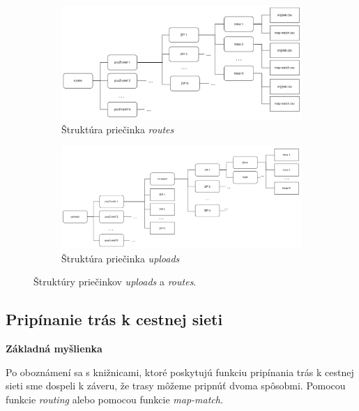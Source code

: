 \begin{figure}[H]
    \centering
    \begin{subfigure}{\textwidth}
        \centering
        \includegraphics[width=1\textwidth]{img/struktura priecinkov/routes.png}
        \caption{Štruktúra priečinka \textit{routes}}
        \label{fig:routes-structure}
    \end{subfigure}
    \begin{subfigure}{\textwidth}
        \centering
        \includegraphics[width=1\textwidth]{img/struktura priecinkov/uploads.png}
        \caption{Štruktúra priečinka \textit{uploads}}
        \label{fig:uploads-structure}
    \end{subfigure}
    \caption{Štruktúry priečinkov \textit{uploads} a \textit{routes}.}
    \label{fig:uploads-routes-structure}
\end{figure}


\subsection{Pripínanie trás k cestnej sieti \label{section:pripinanie}}
\textbf{Základná myšlienka}

Po oboznámení sa s knižnicami, ktoré poskytujú funkciu pripínania trás k cestnej sieti sme dospeli k záveru, že trasy môžeme pripnúť dvoma spôsobmi\cite{mapbox}\cite{valhalla}\cite{graphopper}. Pomocou funkcie \textit{routing} alebo pomocou funkcie \textit{map-match}. 

